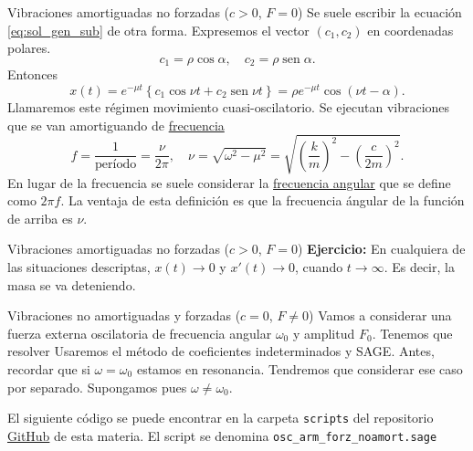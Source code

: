 \documentclass[handout,hyperref={colorlinks=true}]{beamer}
\renewcommand{\emph}[1]{\textcolor[rgb]{1,0,0}{#1}}
\DeclareMathOperator{\sen}{sen}
\begin{document}
\begin{frame}{ Vibraciones amortiguadas no forzadas ($c>0$, $F=0$) }
Se suele escribir la ecuación \eqref{eq:sol_gen_sub} de otra forma. Expresemos el vector $(c_1,c_2)$ en 
coordenadas polares. 
\[
c_1=\rho\cos\alpha,\quad c_2=\rho\sen\alpha.
\]
Entonces
\[
 x(t)=e^{-\mu t}\left\{ c_1\cos \nu t+c_2\sen \nu t    \right\}=\boxed{\rho e^{-\mu t}\cos(\nu t-\alpha)}.
\]
Llamaremos este régimen \emph{movimiento  cuasi-oscilatorio}. Se ejecutan vibraciones que se van amortiguando
de \href{http://es.wikipedia.org/wiki/Frecuencia}{frecuencia}
\[
  f=\frac{1}{\text{período}}=\frac{\nu}{2\pi},\quad \nu=\sqrt{\omega^2-\mu^2}=\sqrt{\left(\frac{k}{m}\right)^2-
  \left(\frac{c}{2m}\right)^2}.
\]
En lugar de la frecuencia se suele considerar la 
\href{http://luz.izt.uam.mx/mediawiki/index.php/Frecuencia_angular}{frecuencia angular} que se define como 
$2\pi f$. La ventaja de esta definición es que la frecuencia ángular de la función de arriba es
$\nu$. 
\end{frame}



\begin{frame}{ Vibraciones amortiguadas no forzadas ($c>0$, $F=0$) }
\textbf{Ejercicio:} En cualquiera de las situaciones descriptas, $x(t)\to 0$ y $x'(t)\to 0$, cuando $t\to\infty$. 
Es decir, la masa se va deteniendo.                                                                                                                                                                                                                                                                         
 


\end{frame}


\begin{frame}{ Vibraciones no amortiguadas y forzadas ($c=0$, $F\neq 0$) }
Vamos a considerar una fuerza externa oscilatoria de frecuencia angular $\omega_0$ y amplitud $F_0$. Tenemos que resolver
Usaremos el método de coeficientes indeterminados y SAGE. Antes, recordar que si $\omega=\omega_0$ estamos en 
resonancia. Tendremos que considerar ese caso por separado. Supongamos pues $\omega\neq\omega_0$.

El siguiente código se puede encontrar en la carpeta \texttt{scripts} del repositorio 
\href{https://github.com/fdmazzone/Ecuaciones_Diferenciales}{GitHub} de esta  materia. El script se denomina \texttt{osc\_arm\_forz\_noamort.sage} 
 

\end{frame}
\end{document}
